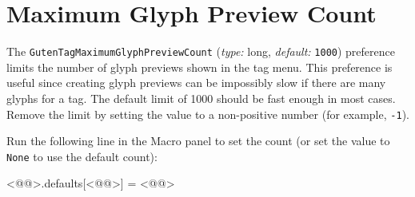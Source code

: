 \section{Maximum Glyph Preview Count}%
\label{preference:maximum-glyph-preview-count}

The \texttt{GutenTagMaximumGlyphPreviewCount} (\emph{type:} long, \emph{default:} \texttt{1000}) preference limits the number of glyph previews shown in the tag menu. This preference is useful since creating glyph previews can be impossibly slow if there are many glyphs for a tag. The default limit of 1000 should be fast enough in most cases. Remove the limit by setting the value to a non-positive number (for example, \texttt{-1}).

Run the following line in the Macro panel to set the count (or set the value to \texttt{None} to use the default count):

\begin{RichListing}
<@@>.defaults[<@@>] = <@@>
\end{RichListing}
